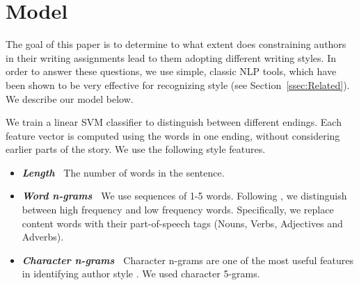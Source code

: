 \documentclass[11pt,a4paper]{article}
\newcommand{\secref}[1]{Section~\ref{ssec:#1}}
\newcommand{\isectionb}[1]{\section{#1}\label{ssec:#1}}
\newcommand{\roy}[1]{\footnote{\color{red}{\textbf{Roy: #1}}}}
\begin{document}


\isectionb{Model}

The goal of this paper is to determine to what extent does constraining authors in their writing assignments lead to them adopting different writing styles. 
In order to answer these questions, we use simple, classic NLP tools, which have been shown to be very effective for recognizing style (see \secref{Related}).
We describe our model below.

We train a linear SVM classifier to distinguish between different endings. 
Each feature vector is computed using the words in one ending, without considering earlier parts of the story. 
We use the following style features.

\begin{itemize}
\item\textit{\textbf{Length~}} The number of words in the sentence.
\item\textit{\textbf{Word n-grams~}} We use sequences of 1-5 words. Following \cite{Tsur:2010,Schwartz:2013}, we distinguish between high frequency and low frequency words. 
Specifically, we replace content words with their part-of-speech tags (Nouns, Verbs, Adjectives and Adverbs).
\item\textit{\textbf{Character n-grams~}} Character n-grams are one of the most useful features in identifying author style \cite{Stamatatos:2009}. 
We used character 5-grams.
\end{itemize}
\end{document}
